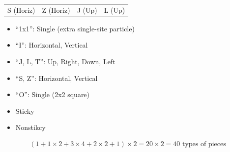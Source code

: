 \documentclass[9pt,table,xcolor=dvipsnames]{beamer}
\begin{document}
\begin{frame}
\begin{center}
\begin{tabular}{cccc}
      {\small S (Horiz)} & {\small Z (Horiz)} & {\small J (Up)} & {\small L (Up)} \\
    \end{tabular}
  \end{center}
  \vfill
  \begin{minipage}{0.65\textwidth}
    \begin{itemize}
      \item ``1x1'': Single (extra single-site particle)
      \item ``I'': Horizontal, Vertical
      \item ``J, L, T'': Up, Right, Down, Left
      \item ``S, Z'': Horizontal, Vertical
      \item ``O'': Single (2x2 square)
    \end{itemize}
  \end{minipage}
  \begin{minipage}{0.30\textwidth}
    \begin{itemize}
      \item Sticky
      \item Nonstikcy
    \end{itemize}
  \end{minipage}
  \pause
  \begin{align*}
    (1+1\times 2 +3\times 4 + 2 \times 2 + 1) \times 2 = 20 \times 2 = 40 \text{ types of pieces}
  \end{align*}
\end{frame}
\end{document}
